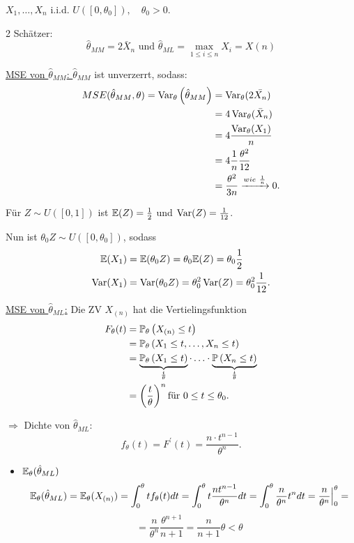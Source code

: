 \documentclass{tstextbook}
\begin{document}
\begin{example}
	$ X_1,\ldots,X_n $	i.i.d. $ U\left([0,\theta_0]\right), \quad \theta_0 > 0 $. 
	
	2 Schätzer: \[ \hat{ \theta}_{MM} = 2 \bar {X}_n  \text{ und }   \hat{ \theta}_{ML} = \max_{ 1 \leq i \leq n } X_i = X(n) \]
	
	\underline {MSE von $ \hat{\theta}_{MM}$: } $ \hat{\theta}_{MM}$ ist unverzerrt, sodass:
	\[
	\begin{aligned}
	MSE( \hat{\theta}_{MM}, \theta)=
	\operatorname{Var}_\theta\left(\hat{\theta}_{MM}\right) & = \operatorname{Var}_\theta(2\bar{X_n}) \\
	& = 4 \operatorname{Var}_\theta(\bar{X}_n) \\
	& = 4 \frac{\operatorname{Var}_\theta(X_1)}{n}\\
	& = 4 \frac{1}{n} \frac{\theta^2}{12} \\
	& = \frac{\theta^2}{3n} \xrightarrow{wie \ \frac{1}{n}} 0. 
	\end{aligned}
	\]
	
	
	Für $ Z\sim U\left([0,1]\right) $ ist $ \mathbb E(Z)=\frac{1}{2} $ und $ \operatorname{Var}(Z)=\frac{1}{12} $. 
	
	Nun ist $ \theta_0 Z \sim U\left([0,\theta_0]\right) $, sodass 
	\[
	\begin{aligned}
	\mathbb E(X_1) &=\mathbb E(\theta_0 Z) = \theta_0 \mathbb E(Z) = \theta_0 \frac{1}{2} \\
	\operatorname{Var}(X_1) &= \operatorname{Var}(\theta_0 Z) = \theta_0^2 \operatorname{Var}(Z) = \theta_0^2 \frac{1}{12}.
	\end{aligned}
	\]


	\underline {MSE von $ \hat{\theta}_{ML}$:} Die ZV $X_{(n)}$ hat die Vertielingsfunktion  
		\[
		\begin{aligned}
			F_\theta(t) & = \mathbb P_\theta \left(X_{(n)} \le t \right) \\
			& = \mathbb P_\theta \left(X_1 \le t, \ldots, X_n \le t \right) \\
			& = \underbrace{\mathbb P_\theta \left(X_1 \le t \right)}_{\frac{t}{\theta}}\cdot\ldots\cdot \underbrace{\mathbb P\left(X_n \le t \right)}_{\frac{t}{\theta}} \\
			& = \left(\frac{t}{\theta}\right)^n \text{für} \  0 \le t \le  \theta_0 .
		\end{aligned}
		\] 
		
		$\Rightarrow$ Dichte von $ \hat{\theta}_{ML} $: 
		\[
		f_\theta(t) = F^\prime (t) = \frac{n\cdot t^{n-1}}{\theta^n}.
		\]

	\begin{itemize}
	\item $ \mathbb E_\theta ({ \hat{\theta}_{ML}}) $
	 \[  \mathbb E_\theta ({ \hat{\theta}_{ML}}) = \mathbb E_\theta(X_{(n)}) = \int_{0}^{\theta} t f_\theta (t) dt = \int_{0}^{\theta} t \frac{nt^{n-1}}{\theta^n}dt 	= \int_{0}^{\theta}  \frac{n}{\theta^n} t^n dt= \frac{n}{\theta^n}  \Big|_0^{\theta} =    \]
	\[ = \frac{n}{\theta^n} \frac{\theta^{n+1}}{n+1} = \frac{n}{n+1} \theta < \theta \]
	

\end{itemize}
\end{example}
\end{document}
